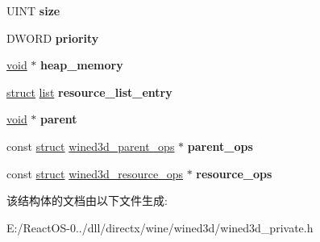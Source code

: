 \begin{DoxyCompactItemize}
U\+I\+NT {\bfseries size}
\item 
\mbox{\label{structwined3d__resource_aa07c736ba55afff2cb58d62ef83c52b1}} 
D\+W\+O\+RD {\bfseries priority}
\item 
\mbox{\label{structwined3d__resource_ad6ba7d659e14acb136f348cf4e5e65c6}} 
\hyperlink{interfacevoid}{void} $\ast$ {\bfseries heap\+\_\+memory}
\item 
\mbox{\label{structwined3d__resource_ab531d21f9cd1fc4cb5a8e62ea968c1e6}} 
\hyperlink{interfacestruct}{struct} \hyperlink{classlist}{list} {\bfseries resource\+\_\+list\+\_\+entry}
\item 
\mbox{\label{structwined3d__resource_a0463e830239b9ecfbd45da042615ffa0}} 
\hyperlink{interfacevoid}{void} $\ast$ {\bfseries parent}
\item 
\mbox{\label{structwined3d__resource_a220b1d9148dc3e2ce4932dc79f38cdfe}} 
const \hyperlink{interfacestruct}{struct} \hyperlink{structwined3d__parent__ops}{wined3d\+\_\+parent\+\_\+ops} $\ast$ {\bfseries parent\+\_\+ops}
\item 
\mbox{\label{structwined3d__resource_ad71775a006de7adcc907698fb9ac78db}} 
const \hyperlink{interfacestruct}{struct} \hyperlink{structwined3d__resource__ops}{wined3d\+\_\+resource\+\_\+ops} $\ast$ {\bfseries resource\+\_\+ops}
\end{DoxyCompactItemize}


该结构体的文档由以下文件生成\+:\begin{DoxyCompactItemize}
\item 
E\+:/\+React\+O\+S-\/0../dll/directx/wine/wined3d/wined3d\+\_\+private.\+h\end{DoxyCompactItemize}
